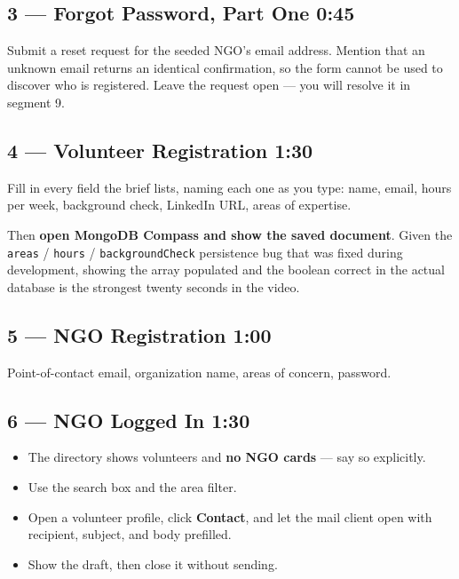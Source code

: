 \documentclass[11pt,letterpaper]{article}
\begin{document}
\subsection*{3 --- Forgot Password, Part One \hfill \normalfont\small 0:45}

Submit a reset request for the seeded NGO's email address. Mention that an
unknown email returns an identical confirmation, so the form cannot be used
to discover who is registered. Leave the request open --- you will resolve
it in segment 9.

\subsection*{4 --- Volunteer Registration \hfill \normalfont\small 1:30}

Fill in every field the brief lists, naming each one as you type: name,
email, hours per week, background check, LinkedIn URL, areas of expertise.

Then \textbf{open MongoDB Compass and show the saved document}. Given the
\texttt{areas} / \texttt{hours} / \texttt{backgroundCheck} persistence bug
that was fixed during development, showing the array populated and the
boolean correct in the actual database is the strongest twenty seconds in
the video.

\subsection*{5 --- NGO Registration \hfill \normalfont\small 1:00}

Point-of-contact email, organization name, areas of concern, password.

\subsection*{6 --- NGO Logged In \hfill \normalfont\small 1:30}

\begin{itemize}
  \item The directory shows volunteers and \textbf{no NGO cards} --- say so
        explicitly.
  \item Use the search box and the area filter.
  \item Open a volunteer profile, click \textbf{Contact}, and let the mail
        client open with recipient, subject, and body prefilled.
  \item Show the draft, then close it without sending.
\end{itemize}
\end{document}
